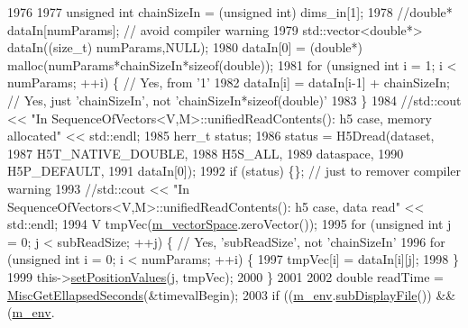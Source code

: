 \begin{DoxyCode}
1976 
1977               \textcolor{keywordtype}{unsigned} \textcolor{keywordtype}{int} chainSizeIn = (\textcolor{keywordtype}{unsigned} int) dims\_in[1];
1978               \textcolor{comment}{//double* dataIn[numParams]; // avoid compiler warning}
1979         std::vector<double*> dataIn((\textcolor{keywordtype}{size\_t}) numParams,NULL);
1980               dataIn[0] = (\textcolor{keywordtype}{double}*) malloc(numParams*chainSizeIn*\textcolor{keyword}{sizeof}(\textcolor{keywordtype}{double}));
1981               \textcolor{keywordflow}{for} (\textcolor{keywordtype}{unsigned} \textcolor{keywordtype}{int} i = 1; i < numParams; ++i) \{ \textcolor{comment}{// Yes, from '1'}
1982                 dataIn[i] = dataIn[i-1] + chainSizeIn; \textcolor{comment}{// Yes, just 'chainSizeIn', not
       'chainSizeIn*sizeof(double)'}
1983               \}
1984               \textcolor{comment}{//std::cout << "In SequenceOfVectors<V,M>::unifiedReadContents(): h5 case, memory allocated"
       << std::endl;}
1985               herr\_t status;
1986               status = H5Dread(dataset,
1987                                H5T\_NATIVE\_DOUBLE,
1988                                H5S\_ALL,
1989                                dataspace,
1990                                H5P\_DEFAULT,
1991                                dataIn[0]);
1992               \textcolor{keywordflow}{if} (status) \{\}; \textcolor{comment}{// just to remover compiler warning}
1993               \textcolor{comment}{//std::cout << "In SequenceOfVectors<V,M>::unifiedReadContents(): h5 case, data read" <<
       std::endl;}
1994               V tmpVec(\hyperlink{class_q_u_e_s_o_1_1_base_vector_sequence_a4bd171e39ed050ff105c808336f35198}{m\_vectorSpace}.zeroVector());
1995               \textcolor{keywordflow}{for} (\textcolor{keywordtype}{unsigned} \textcolor{keywordtype}{int} j = 0; j < subReadSize; ++j) \{ \textcolor{comment}{// Yes, 'subReadSize', not 'chainSizeIn'}
1996                 \textcolor{keywordflow}{for} (\textcolor{keywordtype}{unsigned} \textcolor{keywordtype}{int} i = 0; i < numParams; ++i) \{
1997                   tmpVec[i] = dataIn[i][j];
1998                 \}
1999                 this->\hyperlink{class_q_u_e_s_o_1_1_sequence_of_vectors_a822aecb4ddeb8da89683f6c3a1ce11c1}{setPositionValues}(j, tmpVec);
2000               \}
2001 
2002               \textcolor{keywordtype}{double} readTime = \hyperlink{namespace_q_u_e_s_o_a424bc33f2e6e287fd468408d14b772ee}{MiscGetEllapsedSeconds}(&timevalBegin);
2003               \textcolor{keywordflow}{if} ((\hyperlink{class_q_u_e_s_o_1_1_base_vector_sequence_a8e8824d2a63c5a43bcc6473e3a0491e8}{m\_env}.\hyperlink{class_q_u_e_s_o_1_1_base_environment_a8a0064746ae8dddfece4229b9ad374d6}{subDisplayFile}()) && (\hyperlink{class_q_u_e_s_o_1_1_base_vector_sequence_a8e8824d2a63c5a43bcc6473e3a0491e8}{m\_env}.

\end{DoxyCode}
